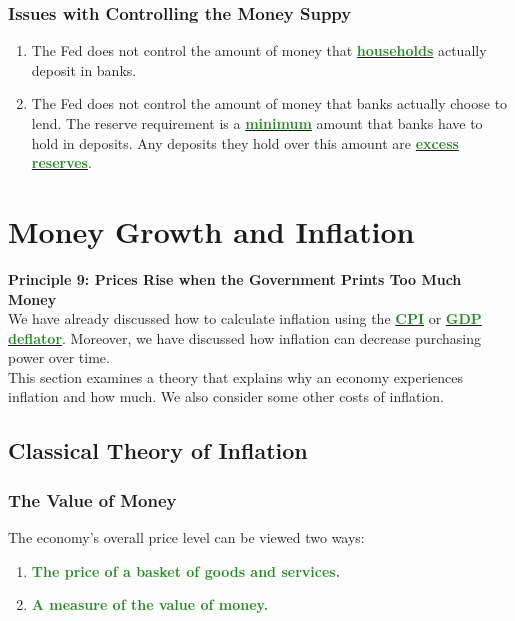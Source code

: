 \documentclass[11pt]{article}\usepackage[]{graphicx}\usepackage[]{color}
\theoremstyle{definition}
\newcommand{\ddp}[1]{{\textbf{\textcolor{ForestGreen}{#1}}}}
\newcommand{\dd}[1]{{\underline{\textbf{\textcolor{ForestGreen}{#1}}}}}
\begin{document}
\subsubsection*{Issues with Controlling the Money Suppy}

\begin{enumerate}
	\item The Fed does not control the amount of money that \dd{households} actually deposit in banks. 
	\item The Fed does not control the amount of money that banks actually choose to lend. The reserve requirement is a \dd{minimum} amount that banks have to hold in deposits. Any deposits they hold over this amount are \dd{excess reserves}.
\end{enumerate}

\newpage

\section{Money Growth and Inflation}

\textbf{Principle 9: Prices Rise when the Government Prints Too Much Money}
\\

We have already discussed how to calculate inflation using the \dd{CPI} or \dd{GDP deflator}. Moreover, we have discussed how inflation can decrease purchasing power over time.
\\

This section examines a theory that explains why an economy experiences inflation and how much. We also consider some other costs of inflation.

\subsection{Classical Theory of Inflation}

\subsubsection*{The Value of Money}

The economy's overall price level can be viewed two ways:

\begin{enumerate}
	\item \ddp{The price of a basket of goods and services.}
	\item \ddp{A measure of the value of money.}
\end{enumerate}
\end{document}
